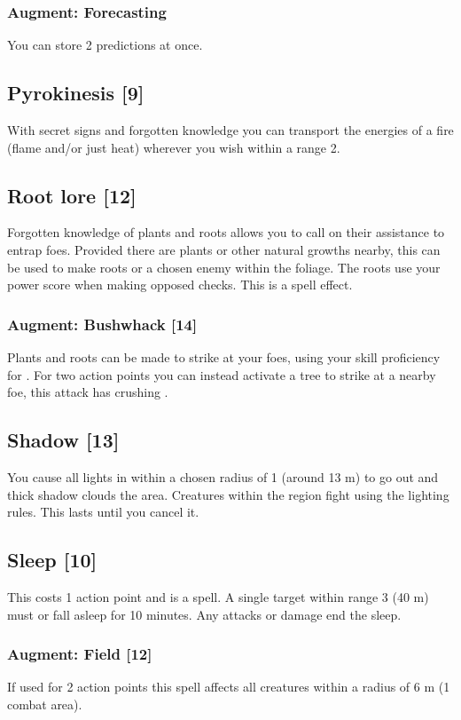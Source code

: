 \subsubsection{Augment: Forecasting}
You can store 2 predictions at once.


\subsection{Pyrokinesis [9]}
With secret signs and forgotten knowledge you can transport the energies of a fire (flame and/or just heat) wherever you wish within a range 2. 


\subsection{Root lore [12]}
Forgotten knowledge of plants and roots allows you to call on their assistance to entrap foes. Provided there are plants or other natural growths nearby, this can be used to make roots  or  a chosen enemy within the foliage. The roots use your  power score when making opposed checks. This is a  spell effect.
\subsubsection{Augment: Bushwhack [14]}
Plants and roots can be made to strike at your foes, using your  skill proficiency for . For two action points you can instead activate a tree to strike at a nearby foe, this attack has crushing .


\subsection{Shadow [13]}
You cause all lights in within a chosen radius of 1 (around 13 m) to go out and thick shadow clouds the area. Creatures within the region fight using the  lighting rules. This lasts until you cancel it.


\subsection{Sleep [10]}
This costs 1 action point and is a  spell. A single target within range 3 (40 m) must  or fall asleep for 10 minutes. Any attacks or damage end the sleep. 
\subsubsection{Augment: Field [12]}
If used for 2 action points this spell affects all creatures within a radius of 6 m (1 combat area).


